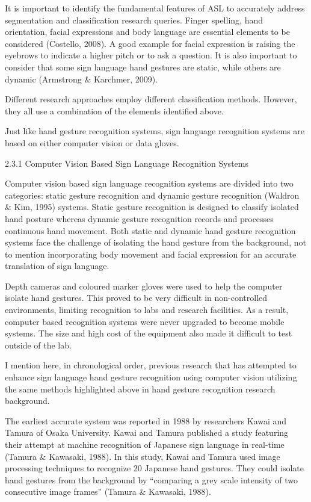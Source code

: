 It is important to identify the fundamental features of ASL to accurately address segmentation and classification research queries. Finger spelling, hand orientation, facial expressions and body language are essential elements to be considered (Costello, 2008). A good example for facial expression is raising the eyebrows to indicate a higher pitch or to ask a question. It is also important to consider that some sign language hand gestures are static, while others are dynamic (Armstrong \& Karchmer, 2009). 

Different research approaches employ different classification methods. However, they all use a combination of the elements identified above.

Just like hand gesture recognition systems, sign language recognition systems are based on either computer vision or data gloves.

2.3.1 Computer Vision Based Sign Language Recognition Systems 

Computer vision based sign language recognition systems are divided into two categories: static gesture recognition and dynamic gesture recognition (Waldron \& Kim, 1995) systems. Static gesture recognition is designed to classify isolated hand posture whereas dynamic gesture recognition records and processes continuous hand movement. Both static and dynamic hand gesture recognition systems face the challenge of isolating the hand gesture from the background, not to mention incorporating body movement and facial expression for an accurate translation of sign language. 

Depth cameras and coloured marker gloves were used to help the computer isolate hand gestures. This proved to be very difficult in non-controlled environments, limiting recognition to labs and research facilities. As a result, computer based recognition systems were never upgraded to become mobile systems. The size and high cost of the equipment also made it difficult to test outside of the lab.  

I mention here, in chronological order, previous research that has attempted to enhance sign language hand gesture recognition using computer vision utilizing the same methods highlighted above in hand gesture recognition research background.

The earliest accurate system was reported in 1988 by researchers Kawai and Tamura of Osaka University. Kawai and Tamura published a study featuring their attempt at machine recognition of Japanese sign language in real-time (Tamura \& Kawasaki, 1988). In this study, Kawai and Tamura used image processing techniques to recognize 20 Japanese hand gestures. They could isolate hand gestures from the background by ``comparing a grey scale intensity of two consecutive image frames'' (Tamura \& Kawasaki, 1988).


